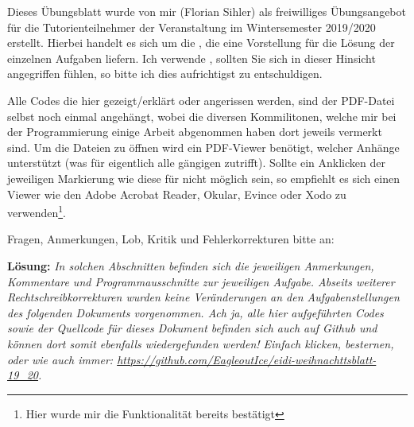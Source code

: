 \documentclass[table]{sopra-base}
\makeatletter
\let\T\texttt
\def\pc{\noexpand\rotatebox[origin=c]{270}{\noexpand\faPaperclip{}}}
\def\aJava#1{\attachDocumentText{#1}{\pc{} #1}}
\newenvironment{solution}{\null\par\noindent\textbf{\textcolor{sob@col@uulm@cs}{Lösung:}}\newline\bgroup\color{black}\slshape\ignorespaces}{\egroup}
\makeatother
\begin{document}
Dieses Übungsblatt wurde von mir (Florian Sihler) als freiwilliges Übungsangebot für die Tutorienteilnehmer der Veranstaltung  im Wintersemester 2019/2020 erstellt. Hierbei handelt es sich um die , die eine Vorstellung für die Lösung der einzelnen Aufgaben liefern. Ich verwende \say{\T{du}}, sollten Sie sich in dieser Hinsicht angegriffen fühlen, so bitte ich dies aufrichtigst zu entschuldigen.\par{}

Alle Codes die hier gezeigt/erklärt oder angerissen werden, sind der PDF-Datei selbst noch einmal
angehängt, wobei die diversen Kommilitonen, welche mir bei der Programmierung einige Arbeit abgenommen haben dort jeweils vermerkt sind. Um die Dateien zu öffnen wird ein PDF-Viewer benötigt, welcher Anhänge unterstützt (was für eigentlich alle gängigen zutrifft). Sollte ein Anklicken der jeweiligen Markierung wie diese für \aJava{Test.java} nicht möglich sein, so empfiehlt es sich einen Viewer wie den Adobe Acrobat Reader, Okular, Evince oder Xodo zu verwenden\footnote{Hier wurde mir die Funktionalität bereits bestätigt \Laughey}. 

\begin{center}
    Fragen, Anmerkungen, Lob, Kritik und Fehlerkorrekturen bitte an:\\
\end{center}

\begin{solution}
    In solchen Abschnitten befinden sich die jeweiligen Anmerkungen, Kommentare und Programmausschnitte zur jeweiligen Aufgabe. Abseits weiterer Rechtschreibkorrekturen wurden keine Veränderungen an den Aufgabenstellungen des folgenden Dokuments vorgenommen. Ach ja, alle hier aufgeführten Codes sowie der Quellcode für dieses Dokument befinden sich auch auf Github und können dort somit ebenfalls wiedergefunden werden! Einfach klicken, besternen, oder wie auch immer: \url{https://github.com/EagleoutIce/eidi-weihnachttsblatt-19_20}.
\end{solution}

%
%
%
%
\end{document}
